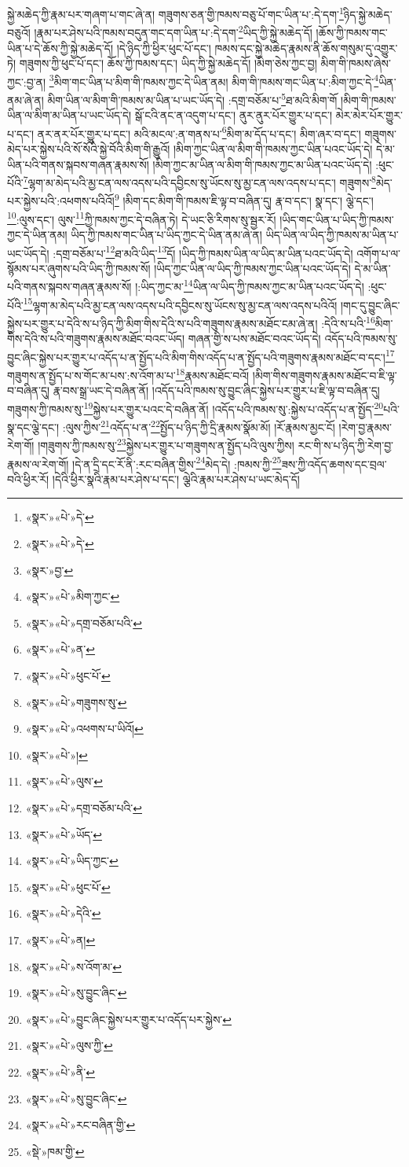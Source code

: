 སྐྱེ་མཆེད་ཀྱི་རྣམ་པར་གཞག་པ་གང་ཞེ་ན། གཟུགས་ཅན་གྱི་ཁམས་བཅུ་པོ་གང་ཡིན་པ་:དེ་དག་\footnote{«སྣར་»«པེ་»དེ་}ཉིད་སྐྱེ་མཆེད་བཅུའོ། །རྣམ་པར་ཤེས་པའི་ཁམས་བདུན་གང་དག་ཡིན་པ་:དེ་དག་\footnote{«སྣར་»«པེ་»དེ་}ཡིད་ཀྱི་སྐྱེ་མཆེད་དོ། །ཆོས་ཀྱི་ཁམས་གང་ཡིན་པ་དེ་ཆོས་ཀྱི་སྐྱེ་མཆེད་དོ། །དེ་ཉིད་ཀྱི་ཕྱིར་ཕུང་པོ་དང་། ཁམས་དང་སྐྱེ་མཆེད་རྣམས་ནི་ཆོས་གསུམ་དུ་འགྱུར་ཏེ། གཟུགས་ཀྱི་ཕུང་པོ་དང་། ཆོས་ཀྱི་ཁམས་དང་། ཡིད་ཀྱི་སྐྱེ་མཆེད་དོ། །མིག་ཅེས་ཀྱང་བྱ། མིག་གི་ཁམས་ཞེས་ཀྱང་:བྱ་ན། \footnote{«སྣར་»བྱ་}མིག་གང་ཡིན་པ་མིག་གི་ཁམས་ཀྱང་དེ་ཡིན་ནམ། མིག་གི་ཁམས་གང་ཡིན་པ་:མིག་ཀྱང་དེ་\footnote{«སྣར་»«པེ་»མིག་ཀྱང་}ཡིན་ནམ་ཞེ་ན། མིག་ཡིན་ལ་མིག་གི་ཁམས་མ་ཡིན་པ་ཡང་ཡོད་དེ། :དགྲ་བཅོམ་པ་\footnote{«སྣར་»«པེ་»དགྲ་བཅོམ་པའི་}ཐ་མའི་མིག་གོ །མིག་གི་ཁམས་ཡིན་ལ་མིག་མ་ཡིན་པ་ཡང་ཡོད་དེ། སྒོ་ངའི་ནང་ན་འདུག་པ་དང་། ནུར་ནུར་པོར་གྱུར་པ་དང་། མེར་མེར་པོར་གྱུར་པ་དང་། ནར་ནར་པོར་གྱུར་པ་དང་། མའི་མངལ་:ན་གནས་པ་\footnote{«སྣར་»«པེ་»ན་}མིག་མ་དོད་པ་དང་། མིག་ཞར་བ་དང་། གཟུགས་མེད་པར་སྐྱེས་པའི་སོ་སོའི་སྐྱེ་བོའི་མིག་གི་རྒྱུའོ། །མིག་ཀྱང་ཡིན་ལ་མིག་གི་ཁམས་ཀྱང་ཡིན་པའང་ཡོད་དེ། དེ་མ་ཡིན་པའི་གནས་སྐབས་གཞན་རྣམས་སོ། །མིག་ཀྱང་མ་ཡིན་ལ་མིག་གི་ཁམས་ཀྱང་མ་ཡིན་པའང་ཡོད་དེ། :ཕུང་པོའི་\footnote{«སྣར་»«པེ་»ཕུང་པོ་}ལྷག་མ་མེད་པའི་མྱ་ངན་ལས་འདས་པའི་དབྱིངས་སུ་ཡོངས་སུ་མྱ་ངན་ལས་འདས་པ་དང་། གཟུགས་\footnote{«སྣར་»«པེ་»གཟུགས་སུ་}མེད་པར་སྐྱེས་པའི་:འཕགས་པའིའོ།\footnote{«སྣར་»«པེ་»འཕགས་པ་ཡིའོ།} །མིག་དང་མིག་གི་ཁམས་ཇི་ལྟ་བ་བཞིན་དུ། རྣ་བ་དང་། སྣ་དང་། ལྕེ་དང་། \footnote{«སྣར་»«པེ་»།  }:ལུས་དང་། ལུས་\footnote{«སྣར་»«པེ་»ལུས་}ཀྱི་ཁམས་ཀྱང་དེ་བཞིན་ཏེ། དེ་ཡང་ཅི་རིགས་སུ་སྦྱར་རོ། །ཡིད་གང་ཡིན་པ་ཡིད་ཀྱི་ཁམས་ཀྱང་དེ་ཡིན་ནམ། ཡིད་ཀྱི་ཁམས་གང་ཡིན་པ་ཡིད་ཀྱང་དེ་ཡིན་ནམ་ཞེ་ན། ཡིད་ཡིན་ལ་ཡིད་ཀྱི་ཁམས་མ་ཡིན་པ་ཡང་ཡོད་དེ། :དགྲ་བཅོམ་པ་\footnote{«སྣར་»«པེ་»དགྲ་བཅོམ་པའི་}ཐ་མའི་ཡིད་\footnote{«སྣར་»«པེ་»ཡོད་}དོ། །ཡིད་ཀྱི་ཁམས་ཡིན་ལ་ཡིད་མ་ཡིན་པའང་ཡོད་དེ། འགོག་པ་ལ་སྙོམས་པར་ཞུགས་པའི་ཡིད་ཀྱི་ཁམས་སོ། །ཡིད་ཀྱང་ཡིན་ལ་ཡིད་ཀྱི་ཁམས་ཀྱང་ཡིན་པའང་ཡོད་དེ། དེ་མ་ཡིན་པའི་གནས་སྐབས་གཞན་རྣམས་སོ། །:ཡིད་ཀྱང་མ་\footnote{«སྣར་»«པེ་»ཡིད་ཀྱང་}ཡིན་ལ་ཡིད་ཀྱི་ཁམས་ཀྱང་མ་ཡིན་པའང་ཡོད་དེ། :ཕུང་པོའི་\footnote{«སྣར་»«པེ་»ཕུང་པོ་}ལྷག་མ་མེད་པའི་མྱ་ངན་ལས་འདས་པའི་དབྱིངས་སུ་ཡོངས་སུ་མྱ་ངན་ལས་འདས་པའིའོ། །གང་དུ་བྱུང་ཞིང་སྐྱེས་པར་གྱུར་པ་དེའི་ས་པ་ཉིད་ཀྱི་མིག་གིས་དེའི་ས་པའི་གཟུགས་རྣམས་མཐོང་ངམ་ཞེ་ན། :དེའི་ས་པའི་\footnote{«སྣར་»«པེ་»དེའི་}མིག་གིས་དེའི་ས་པའི་གཟུགས་རྣམས་མཐོང་བའང་ཡོད། གཞན་གྱི་ས་པས་མཐོང་བའང་ཡོད་དེ། འདོད་པའི་ཁམས་སུ་བྱུང་ཞིང་སྐྱེས་པར་གྱུར་པ་འདོད་པ་ན་སྤྱོད་པའི་མིག་གིས་འདོད་པ་ན་སྤྱོད་པའི་གཟུགས་རྣམས་མཐོང་བ་དང་།\footnote{«སྣར་»«པེ་»ན།} གཟུགས་ན་སྤྱོད་པ་ས་གོང་མ་པས་:ས་འོག་མ་པ་\footnote{«སྣར་»«པེ་»ས་འོག་མ་}རྣམས་མཐོང་བའོ། །མིག་གིས་གཟུགས་རྣམས་མཐོང་བ་ཇི་ལྟ་བ་བཞིན་དུ། རྣ་བས་སྒྲ་ཡང་དེ་བཞིན་ནོ། །འདོད་པའི་ཁམས་སུ་བྱུང་ཞིང་སྐྱེས་པར་གྱུར་པ་ཇི་ལྟ་བ་བཞིན་དུ། གཟུགས་ཀྱི་ཁམས་སུ་\footnote{«སྣར་»«པེ་»སུ་བྱུང་ཞིང་}སྐྱེས་པར་གྱུར་པའང་དེ་བཞིན་ནོ། །འདོད་པའི་ཁམས་སུ་:སྐྱེས་པ་འདོད་པ་ན་སྤྱོད་\footnote{«སྣར་»«པེ་»བྱུང་ཞིང་སྐྱེས་པར་གྱུར་པ་འདོད་པར་སྐྱེས་}པའི་སྣ་དང་ལྕེ་དང་། :ལུས་ཀྱིས་\footnote{«སྣར་»«པེ་»ལུས་ཀྱི་}འདོད་པ་ན་\footnote{«སྣར་»«པེ་»ནི་}སྤྱོད་པ་ཉིད་ཀྱི་དྲི་རྣམས་སྣོམ་མོ། །རོ་རྣམས་མྱང་ངོ། །རེག་བྱ་རྣམས་རེག་གོ། །གཟུགས་ཀྱི་ཁམས་སུ་\footnote{«སྣར་»«པེ་»སུ་བྱུང་ཞིང་}སྐྱེས་པར་གྱུར་པ་གཟུགས་ན་སྤྱོད་པའི་ལུས་ཀྱིས། རང་གི་ས་པ་ཉིད་ཀྱི་རེག་བྱ་རྣམས་ལ་རེག་གོ། །དེ་ན་དྲི་དང་རོ་ནི་:རང་བཞིན་གྱིས་\footnote{«སྣར་»«པེ་»རང་བཞིན་གྱི་}མེད་དེ། :ཁམས་ཀྱི་\footnote{«སྡེ་»ཁམ་གྱི་}ཟས་ཀྱི་འདོད་ཆགས་དང་བྲལ་བའི་ཕྱིར་རོ། །དེའི་ཕྱིར་སྣའི་རྣམ་པར་ཤེས་པ་དང་། ལྕེའི་རྣམ་པར་ཤེས་པ་ཡང་མེད་དོ། 